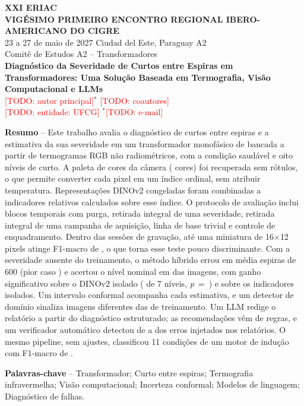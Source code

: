 \documentclass[11pt,a4paper]{article}
\newcommand{\todo}[1]{\textcolor{red}{[TODO: #1]}}
\begin{document}
\begin{center}
{\small\bfseries XXI ERIAC\\ VIGÉSIMO PRIMEIRO ENCONTRO REGIONAL IBERO-AMERICANO DO CIGRE}\\[2pt]
{\small 23 a 27 de maio de 2027 \hfill Ciudad del Este, Paraguay \hfill A2}\\[2pt]
{\small Comitê de Estudos A2 -- Transformadores}\\[14pt]
{\large\bfseries Diagnóstico da Severidade de Curtos entre Espiras em Transformadores: Uma Solução Baseada em Termografia, Visão Computacional e LLMs}\\[10pt]
\todo{autor principal}$^{*}$ \quad \todo{coautores}\\
{\small \todo{entidade: UFCG} \quad $^{*}$\todo{e-mail}}
\end{center}

\noindent\textbf{Resumo} -- Este trabalho avalia o diagnóstico de curtos entre espiras e a estimativa da sua severidade em um transformador monofásico de bancada a partir de \NImagens{} termogramas RGB não radiométricos, com a condição saudável e oito níveis de curto. A paleta de cores da câmera (\NCores{} cores) foi recuperada sem rótulos, o que permite converter cada pixel em um índice ordinal, sem atribuir temperatura. Representações DINOv2 congeladas foram combinadas a indicadores relativos calculados sobre esse índice. O protocolo de avaliação inclui blocos temporais com purga, retirada integral de uma severidade, retirada integral de uma campanha de aquisição, linha de base trivial e controle de enquadramento. Dentro das sessões de gravação, até uma miniatura de 16$\times$12 pixels atinge F1-macro de \FUmBlocosTriv{}, o que torna esse teste pouco discriminante. Com a severidade ausente do treinamento, o método híbrido errou em média \InterpHib{} espiras de 600 (pior caso \InterpHibPior{}) e acertou o nível nominal em \InterpHibNivel{} das imagens, com ganho significativo sobre o DINOv2 isolado (\NHibDino{} de 7 níveis, \textit{p}~=~\PHibDino) e sobre os indicadores isolados. Um intervalo conformal acompanha cada estimativa, e um detector de domínio sinaliza imagens diferentes das de treinamento. Um LLM redige o relatório a partir do diagnóstico estruturado; as recomendações vêm de regras, e um verificador automático detectou de \VerifMin{} a \VerifMax{} dos erros injetados nos relatórios. O mesmo pipeline, sem ajustes, classificou 11 condições de um motor de indução com F1-macro de \MotorFUm{}.

\noindent\textbf{Palavras-chave} -- Transformador; Curto entre espiras; Termografia infravermelha; Visão computacional; Incerteza conformal; Modelos de linguagem; Diagnóstico de falhas.
\end{document}
